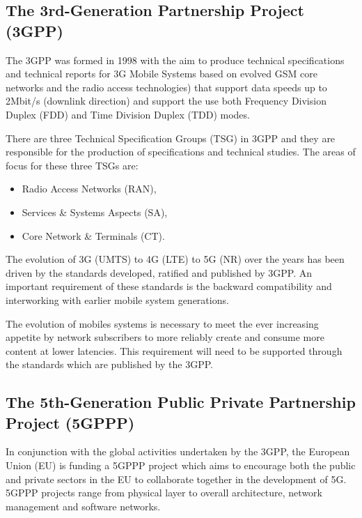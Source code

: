 \subsection{The 3rd-Generation Partnership Project (3GPP)}

The 3GPP was formed in 1998 with the aim to produce technical
specifications and technical reports for 3G Mobile Systems based on
evolved GSM core networks and the radio access technologies) that support
data speeds up to 2Mbit/s (downlink direction) and support the use both
Frequency Division Duplex (FDD) and Time Division Duplex (TDD) modes.

There are three Technical Specification Groups (TSG) in 3GPP and they
are responsible for the production of specifications and technical
studies. The areas of focus for these three TSGs are:

\begin{itemize}
\item Radio Access Networks (RAN),
\item Services \& Systems Aspects (SA),
\item Core Network \& Terminals (CT).
\end{itemize} 

The evolution of 3G (UMTS) to 4G (LTE) to 
5G (NR) over the years has been
driven by the standards developed, ratified and published by 3GPP. An
important requirement of these standards is the backward compatibility
and interworking with earlier mobile system generations.

The evolution of mobiles systems is necessary to meet the ever increasing
appetite by network subscribers to more reliably create and consume more
content at lower latencies.  This requirement will need to be supported
through the standards which are published by the 3GPP.

\subsection{The 5th-Generation Public Private Partnership Project (5GPPP)}

In conjunction with the global activities undertaken by the 3GPP, the
European Union (EU) is funding a 5GPPP project which aims to encourage
both the public and private sectors in the EU to collaborate together
in the development of 5G. 5GPPP projects range from physical layer to
overall architecture, network management and software networks.


